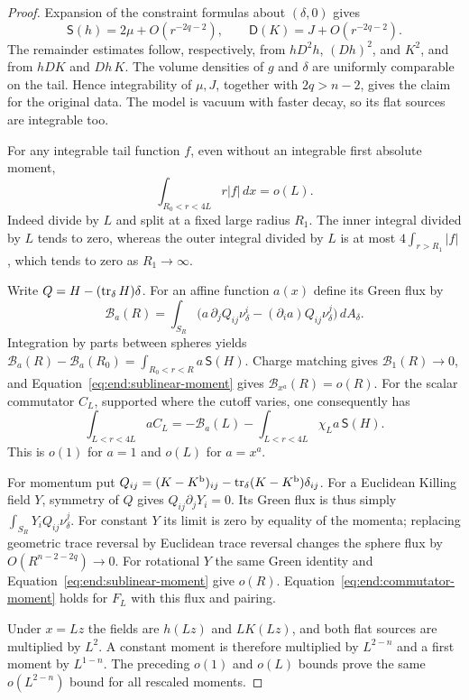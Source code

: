 \begin{proof}
Expansion of the constraint formulas about $(\delta,0)$ gives
\begin{equation}\label{eq:end:flat-remainders}
 \mathsf S(h)=2\mu+O(r^{-2q-2}),\qquad
 \mathsf D(K)=J+O(r^{-2q-2}).
\end{equation}
The remainder estimates follow, respectively, from
$hD^2h$, $(Dh)^2$, and $K^2$, and from $hDK$ and $Dh\,K$.
The volume densities of $g$ and $\delta$ are uniformly comparable
on the tail.  Hence integrability of $\mu,J$, together with
$2q>n-2$, gives the claim for the original data.  The model is
vacuum with faster decay, so its flat sources are integrable too.

For any integrable tail function $f$, even without an integrable
first absolute moment,
\begin{equation}\label{eq:end:sublinear-moment}
 \int_{R_0<r<4L}r|f|\,dx=o(L).
\end{equation}
Indeed divide by $L$ and split at a fixed large radius $R_1$.
The inner integral divided by $L$ tends to zero, whereas the
outer integral divided by $L$ is at most
$4\int_{r>R_1}|f|$, which tends to zero as $R_1\to\infty$.

Write $Q=H-(\operatorname{tr}_\delta H)\delta$.
For an affine function $a(x)$ define its Green flux by
\[
 \mathcal B_a(R)=\int_{S_R}
 \bigl(a\,\partial_jQ_{ij}\nu^i_\delta
                 -(\partial_i a)Q_{ij}\nu^j_\delta\bigr)\,dA_\delta.
\]
Integration by parts between spheres yields
$\mathcal B_a(R)-\mathcal B_a(R_0)
=\int_{R_0<r<R}a\,\mathsf S(H)$.
Charge matching gives $\mathcal B_1(R)\to0$, and
Equation~\eqref{eq:end:sublinear-moment} gives
$\mathcal B_{x^a}(R)=o(R)$.  For the scalar commutator $C_L$, supported where the cutoff varies,
one consequently has
\begin{equation}\label{eq:end:commutator-moment}
 \int_{L<r<4L}a C_L
 =-\mathcal B_a(L)-\int_{L<r<4L}\chi_La\,\mathsf S(H).
\end{equation}
This is $o(1)$ for $a=1$ and $o(L)$ for $a=x^a$.

For momentum put
$Q_{ij}=(K-K^{\mathrm b})_{ij}
-\operatorname{tr}_\delta(K-K^{\mathrm b})\delta_{ij}$.
For a Euclidean Killing field $Y$, symmetry of $Q$ gives
$Q_{ij}\partial_jY_i=0$.  Its Green flux is thus simply
$\int_{S_R}Y_iQ_{ij}\nu^j_\delta$.
For constant $Y$ its limit is zero by equality of the momenta;
replacing geometric trace reversal by Euclidean trace reversal
changes the sphere flux by $O(R^{n-2-2q})\to0$.
For rotational $Y$ the same Green identity and
Equation~\eqref{eq:end:sublinear-moment} give $o(R)$.
Equation~\eqref{eq:end:commutator-moment} holds for $F_L$ with this flux and pairing.

Under $x=Lz$ the fields are $h(Lz)$ and $LK(Lz)$, and both
flat sources are multiplied by $L^2$.  A constant moment is
therefore multiplied by $L^{2-n}$ and a first moment by
$L^{1-n}$.  The preceding $o(1)$ and $o(L)$ bounds prove the
same $o(L^{2-n})$ bound for all rescaled moments.
\end{proof}

